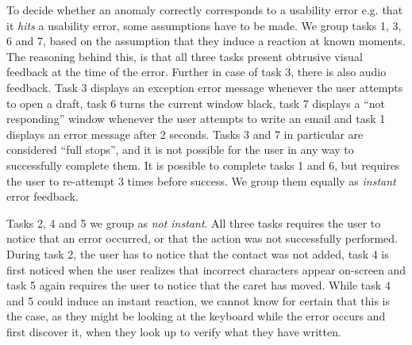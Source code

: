To decide whether an anomaly correctly corresponds to a usability error e.g. that it \textit{hits} a usability error, some assumptions have to be made. 
We group tasks 1, 3, 6 and 7, based on the assumption that they induce a reaction at known moments. The reasoning behind this, is that all three tasks present obtrusive visual feedback at the time of the error. Further in case of task 3, there is also audio
feedback. Task 3 displays an exception error message whenever the user attempts to open a draft, task 6 turns the
current window
black, task 7 displays a ``not responding'' window whenever the user attempts to write an email and task 1 displays an
error message after 2 seconds. Tasks 3 and 7 in particular are considered ``full stops'', and it is not possible for the
user in any way to successfully complete them. It is possible to complete tasks 1 and 6, but requires the user to
re-attempt 3 times before success. We group them equally as \textit{instant} error feedback.

Tasks 2, 4 and 5 we group as \textit{not instant}. All three tasks requires the user to notice that an error occurred, or
that the action was not successfully performed. During task 2, the user has to notice that the contact was not added,
task 4 is first noticed when the user realizes that incorrect characters appear on-screen and task 5 again requires the
user to notice that the caret has moved. While task 4 and 5 could induce an instant reaction, we cannot know for
certain that this is the case, as they might be looking at the keyboard while the error occurs and first discover it, when they look up to verify what they have written.


